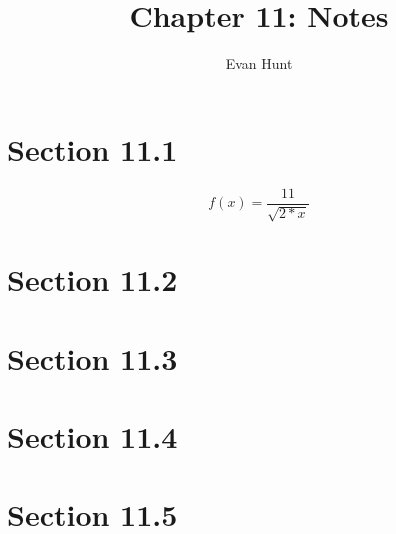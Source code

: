\documentclass[12pt]{article}
\title{Chapter 11: Notes}
\author{Evan Hunt}
\begin{document}
    \maketitle

    \section[]{Section 11.1}
        \begin{equation}
            f(x) = \frac{11}{\sqrt{2*x}}
        \end{equation}
    \section[]{Section 11.2}
    \section[]{Section 11.3}
    \section[]{Section 11.4}
    \section[]{Section 11.5}
\end{document}
